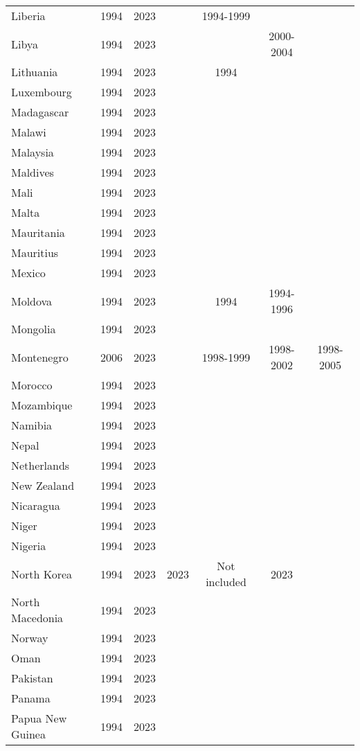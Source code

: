 {\begin{longtable}{lcccccc}
Liberia & 1994 & 2023 &  & 1994-1999 &  & \\
Libya & 1994 & 2023 &  &  & 2000-2004 & \\
Lithuania & 1994 & 2023 &  & 1994 &  & \\
\addlinespace
Luxembourg & 1994 & 2023 &  &  &  & \\
Madagascar & 1994 & 2023 &  &  &  & \\
Malawi & 1994 & 2023 &  &  &  & \\
Malaysia & 1994 & 2023 &  &  &  & \\
Maldives & 1994 & 2023 &  &  &  & \\
\addlinespace
Mali & 1994 & 2023 &  &  &  & \\
Malta & 1994 & 2023 &  &  &  & \\
Mauritania & 1994 & 2023 &  &  &  & \\
Mauritius & 1994 & 2023 &  &  &  & \\
Mexico & 1994 & 2023 &  &  &  & \\
\addlinespace
Moldova & 1994 & 2023 &  & 1994 & 1994-1996 & \\
Mongolia & 1994 & 2023 &  &  &  & \\
Montenegro & 2006 & 2023 &  & 1998-1999 & 1998-2002 & 1998-2005\\
Morocco & 1994 & 2023 &  &  &  & \\
Mozambique & 1994 & 2023 &  &  &  & \\
\addlinespace
Namibia & 1994 & 2023 &  &  &  & \\
Nepal & 1994 & 2023 &  &  &  & \\
Netherlands & 1994 & 2023 &  &  &  & \\
New Zealand & 1994 & 2023 &  &  &  & \\
Nicaragua & 1994 & 2023 &  &  &  & \\
\addlinespace
Niger & 1994 & 2023 &  &  &  & \\
Nigeria & 1994 & 2023 &  &  &  & \\
North Korea & 1994 & 2023 & 2023 & Not included & 2023 & \\
North Macedonia & 1994 & 2023 &  &  &  & \\
Norway & 1994 & 2023 &  &  &  & \\
\addlinespace
Oman & 1994 & 2023 &  &  &  & \\
Pakistan & 1994 & 2023 &  &  &  & \\
Panama & 1994 & 2023 &  &  &  & \\
Papua New Guinea & 1994 & 2023 &  &  &  & \\

\end{longtable}}
